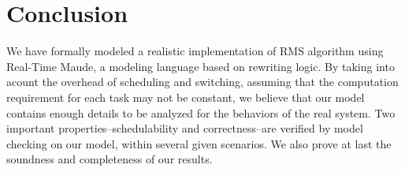 \documentclass{llncs}
\begin{document}
\section{Conclusion}
\label{s:conclusion}
We have formally modeled a realistic implementation of RMS algorithm
using Real-Time Maude, a modeling language based on rewriting
logic. By taking into acount the overhead of scheduling and switching,
assuming that the computation requirement for each task may not be
constant, we believe that our model contains enough details to be
analyzed for the behaviors of the real system. Two important
properties--schedulability and correctness--are verified by model
checking on our model, within several given scenarios. We also prove
at last the soundness and completeness of our results.


 
\end{document}
